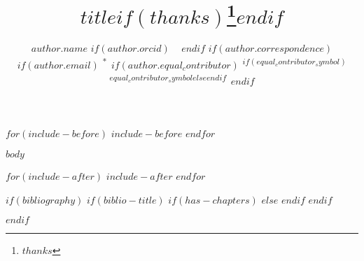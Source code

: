 \documentclass[9pt, twocolumn, toc, lineno]{setting/own/ownarticle}
\title{$title$$if(thanks)$\thanks{$thanks$}$endif$}
\author[$for(author.institute_indices)$%
  $author.institute_indices$%
  $sep$,$endfor$]{%
  $author.name$%
  $if(author.orcid)$
  ~\protect\orcid{$author.orcid$}%
  $endif$%
  $if(author.correspondence)$$if(author.email)$%
  \textsuperscript{*\,}%
  $if(author.equal_contributor)$
  \textsuperscript{$if(equal_contributor_symbol)$$equal_contributor_symbol$$else$\textdagger$endif$\,}%
  $endif$%
}
\affil[$institute.index$]{$institute.name$}
\begin{document}
\maketitle

\renewcommand{\figureautorefname}{Fig.}
\renewcommand{\tableautorefname}{Tab.}
\renewcommand{\equationautorefname}{Eq.}

\makeatletter\if@switchSI\else
{}
\fi\makeatother

$for(include-before)$
$include-before$
$endfor$

$body$

$for(include-after)$
$include-after$
$endfor$

$if(bibliography)$
  $if(biblio-title)$
    $if(has-chapters)$
\renewcommand\bibname{$biblio-title$}
    $else$
\renewcommand\refname{$biblio-title$}
    $endif$
  $endif$

$endif$

\end{document}
